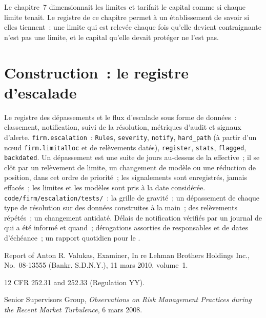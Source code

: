 \begin{remark}\label{rem:fm:the-risk-management-function:ch7}
Le chapitre~7 dimensionnait les limites et tarifait le capital comme si chaque limite tenait. Le registre de ce chapitre permet à un établissement de savoir si elles tiennent~: une limite qui est
relevée chaque fois qu'elle devient contraignante n'est pas une limite, et le capital qu'elle devait protéger ne l'est pas.
\end{remark}

\section{Construction~: le registre d'escalade}\label{bld:fm:the-risk-management-function:escalation}

\begin{build}
 Le registre des dépassements et le flux d'escalade sous forme de données~: classement, notification, suivi de la résolution, métriques d'audit et signaux d'alerte.
 \texttt{firm.escalation}~: \texttt{Rules}, \texttt{severity}, \texttt{notify}, \texttt{hard\_path} (à partir d'un
nœud \texttt{firm.limitalloc} et de relèvements datés), \texttt{register}, \texttt{stats}, \texttt{flagged}, \texttt{backdated}.
 Un dépassement est une suite de jours au-dessus de la  effective~; il se clôt par un relèvement de limite, un changement de modèle ou une réduction de position, dans cet
ordre de priorité~; les signalements sont enregistrés, jamais effacés~; les limites et les modèles sont pris à la date considérée.
 \texttt{code/firm/escalation/tests/}~: la grille de gravité~; un dépassement de chaque type de résolution sur des données construites à la main~; des relèvements
répétés~; un changement antidaté.
 Délais de notification vérifiés par un journal de qui a été informé et quand~; dérogations assorties de responsables et de dates d'échéance~; un rapport quotidien pour le
.
\end{build}

\begin{omsources}
\item Report of Anton R. Valukas, Examiner, In re Lehman Brothers Holdings Inc., No.~08-13555 (Bankr. S.D.N.Y.), 11 mars 2010, volume~1.
\item 12 CFR 252.31 and 252.33 (Regulation YY).
\item Senior Supervisors Group, \emph{Observations on Risk Management Practices during the Recent Market Turbulence}, 6 mars 2008.
\end{omsources}

